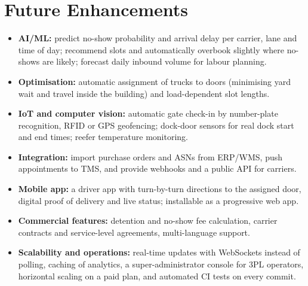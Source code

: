 \section{Future Enhancements}
\begin{itemize}
  \item \textbf{AI/ML:} predict no-show probability and arrival delay per carrier, lane and time of day; recommend slots and automatically overbook slightly where no-shows are likely; forecast daily inbound volume for labour planning.
  \item \textbf{Optimisation:} automatic assignment of trucks to doors (minimising yard wait and travel inside the building) and load-dependent slot lengths.
  \item \textbf{IoT and computer vision:} automatic gate check-in by number-plate recognition, RFID or GPS geofencing; dock-door sensors for real dock start and end times; reefer temperature monitoring.
  \item \textbf{Integration:} import purchase orders and ASNs from ERP/WMS, push appointments to TMS, and provide webhooks and a public API for carriers.
  \item \textbf{Mobile app:} a driver app with turn-by-turn directions to the assigned door, digital proof of delivery and live status; installable as a progressive web app.
  \item \textbf{Commercial features:} detention and no-show fee calculation, carrier contracts and service-level agreements, multi-language support.
  \item \textbf{Scalability and operations:} real-time updates with WebSockets instead of polling, caching of analytics, a super-administrator console for 3PL operators, horizontal scaling on a paid plan, and automated CI tests on every commit.
\end{itemize}
